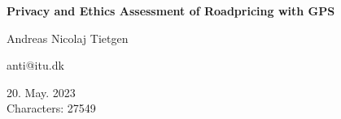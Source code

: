 \documentclass[11pt]{article}
\begin{document}
\begin{titlepage}
    \begin{center}
        \huge
        \textbf{Privacy and Ethics Assessment of Roadpricing with GPS}

        \vspace{3cm}
        \large
        Andreas Nicolaj Tietgen 
        
        anti@itu.dk

        \vfill
        20. May. 2023 \\
        Characters: 27549
    \end{center}
\end{titlepage}
\newpage

\newpage
\tableofcontents

\newpage
{}
\setcounter{page}{1}







\newpage


\end{document}
